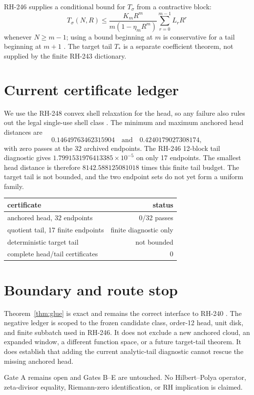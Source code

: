 \documentclass[11pt]{article}
\begin{document}
RH-246 supplies a conditional bound for $T_\sigma$ from a contractive block:
\[
 T_\sigma(N,R)\le
 \frac{K_mR^m}{m(1-\eta_mR^m)}\sum_{r=0}^{m-1}L_rR^r
\]
whenever $N\ge m-1$; using a bound beginning at $m$ is conservative for a
tail beginning at $m+1$ \citep{WangRH246}.  The target tail $T_*$ is a separate
coefficient theorem, not supplied by the finite RH-243 dictionary.

\section{Current certificate ledger}

We use the RH-248 convex shell relaxation for the head, so any failure also
rules out the legal single-use shell class \citep{WangRH243,WangRH248}.  The
minimum and maximum anchored head distances are
\[
 0.14649763462315904\quad\text{and}\quad0.4240179027308174,
\]
with zero passes at the 32 archived endpoints.  The RH-246 12-block tail
diagnostic gives $1.7991531976413385\times10^{-5}$ on only 17 endpoints.
The smallest head distance is therefore $8142.588125081018$ times this
finite tail budget.  The target tail is not bounded, and the two endpoint
sets do not yet form a uniform family.

\begin{center}
\small
\begin{tabular}{lr}
\toprule
certificate & status\\
\midrule
anchored head, 32 endpoints & 0/32 passes\\
quotient tail, 17 finite endpoints & finite diagnostic only\\
deterministic target tail & not bounded\\
complete head/tail certificates & 0\\
\bottomrule
\end{tabular}
\end{center}

\section{Boundary and route stop}

Theorem~\ref{thm:glue} is exact and remains the correct interface to RH-240
\citep{WangRH240}.  The negative ledger is scoped to the frozen candidate
class, order-12 head, unit disk, and finite subbatch used in RH-246.  It does
not exclude a new anchored cloud, an expanded window, a different function
space, or a future target-tail theorem.  It does establish that adding the
current analytic-tail diagnostic cannot rescue the missing anchored head.

Gate A remains open and Gates B--E are untouched.  No Hilbert--Polya
operator, zeta-divisor equality, Riemann-zero identification, or RH
implication is claimed.



\end{document}

